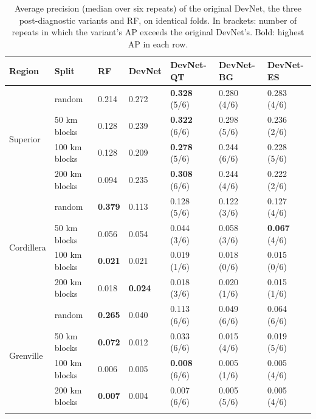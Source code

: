\documentclass[pdflatex,sn-apa]{sn-jnl}
\begin{document}
\begin{appendices}
\begin{table}[!h]
\caption{Average precision (median over six repeats) of the original DevNet, the three post-diagnostic variants and RF, on identical folds. In brackets: number of repeats in which the variant's AP exceeds the original DevNet's. Bold: highest AP in each row.}\label{tab:sensitivity}
\scriptsize
\setlength{\tabcolsep}{2.5pt}
\begin{tabular*}{\textwidth}{@{\extracolsep\fill}lllllll}
\toprule
Region & Split & RF & DevNet & DevNet-QT & DevNet-BG & DevNet-ES \\
\midrule
\multirow{4}{*}{Superior} & random & 0.214 & 0.272 & \textbf{0.328} (5/6) & 0.280 (4/6) & 0.283 (4/6) \\
 & 50 km blocks & 0.128 & 0.239 & \textbf{0.322} (6/6) & 0.298 (5/6) & 0.236 (2/6) \\
 & 100 km blocks & 0.128 & 0.209 & \textbf{0.278} (5/6) & 0.244 (6/6) & 0.228 (5/6) \\
 & 200 km blocks & 0.094 & 0.235 & \textbf{0.308} (6/6) & 0.244 (4/6) & 0.222 (2/6) \\
\midrule
\multirow{4}{*}{Cordillera} & random & \textbf{0.379} & 0.113 & 0.128 (5/6) & 0.122 (3/6) & 0.127 (4/6) \\
 & 50 km blocks & 0.056 & 0.054 & 0.044 (3/6) & 0.058 (3/6) & \textbf{0.067} (4/6) \\
 & 100 km blocks & \textbf{0.021} & 0.021 & 0.019 (1/6) & 0.018 (0/6) & 0.015 (0/6) \\
 & 200 km blocks & 0.018 & \textbf{0.024} & 0.018 (3/6) & 0.020 (1/6) & 0.015 (1/6) \\
\midrule
\multirow{4}{*}{Grenville} & random & \textbf{0.265} & 0.040 & 0.113 (6/6) & 0.049 (6/6) & 0.064 (6/6) \\
 & 50 km blocks & \textbf{0.072} & 0.012 & 0.033 (6/6) & 0.015 (4/6) & 0.019 (5/6) \\
 & 100 km blocks & 0.006 & 0.005 & \textbf{0.008} (6/6) & 0.005 (1/6) & 0.005 (4/6) \\
 & 200 km blocks & \textbf{0.007} & 0.004 & 0.007 (6/6) & 0.005 (5/6) & 0.005 (4/6) \\
\botrule
\end{tabular*}
\end{table}


\end{appendices}
\end{document}
